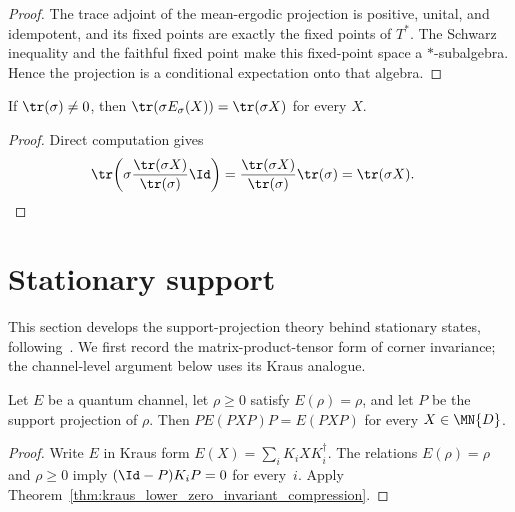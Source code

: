 \begin{proof}\leanok
    The trace adjoint of the mean-ergodic projection is positive, unital, and
    idempotent, and its fixed points are exactly the fixed points of $T^*$.
    The Schwarz inequality and the faithful fixed point make this fixed-point
    space a $*$-subalgebra. Hence the projection is a conditional expectation
    onto that algebra.
\end{proof}

\begin{lemma}
    \label{thm:scalar_conditional_expectation_preserves_weighted_trace}
    \leanok
    If $\tr(\sigma)\neq0$, then
    $\tr(\sigma E_\sigma(X))=\tr(\sigma X)$ for every $X$.
\end{lemma}

\begin{proof}\leanok
    Direct computation gives
    \begin{align}
        \tr\!\left(\sigma\frac{\tr(\sigma X)}{\tr(\sigma)}\Id\right)
        &=\frac{\tr(\sigma X)}{\tr(\sigma)}\tr(\sigma)
          =\tr(\sigma X).
        \notag
    \end{align}
\end{proof}

\section{Stationary support}

This section develops the support-projection theory behind stationary states,
following~\cite[Section~6.4, Propositions~6.10--6.11]{Wolf2012Quantum}.
We first record the matrix-product-tensor form of corner invariance; the
channel-level argument below uses its Kraus analogue.

\begin{lemma}%
    \label{thm:support_proj_fixed}
    \leanok
    Let $E$ be a quantum channel, let $\rho\geq0$ satisfy $E(\rho)=\rho$,
    and let $P$ be the support projection of $\rho$. Then
    $PE(PXP)P=E(PXP)$ for every $X\in\MN{D}$.
\end{lemma}

\begin{proof}
    \leanok
    Write $E$ in Kraus form $E(X)=\sum_iK_iXK_i^\dagger$.
    The relations $E(\rho)=\rho$ and $\rho\geq0$ imply
    $(\Id-P)K_iP=0$ for every~$i$. Apply
    Theorem~\ref{thm:kraus_lower_zero_invariant_compression}.
\end{proof}

